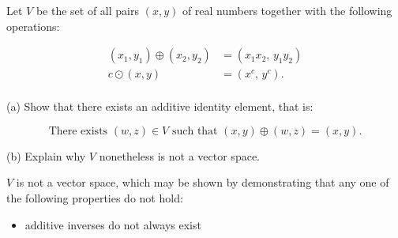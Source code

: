 
\begin{exerciseStatement}


 Let \(V\) be the set of all pairs \((x,y)\) of real numbers together with the following operations: 


\begin{align*} (x_1,y_1)\oplus (x_2,y_2)&= \left(x_{1} x_{2},\,y_{1} y_{2}\right)  \\c \odot (x,y) &= \left(x^{c},\,y^{c}\right) . \\ \end{align*}
            

 (a) Show that there exists an additive identity element, that is: 

\[\text{There exists }(w,z)\in V\text{ such that }(x,y)\oplus(w,z)=(x,y).
    \]

 (b) Explain why \(V\) nonetheless is not a vector space. 


\end{exerciseStatement}
    
\begin{exerciseAnswer} 


\(V\) is not a vector space, which may be shown by demonstrating that any one of the following properties do not hold: 


\begin{itemize}
\item additive inverses do not always exist
\end{itemize}
    
\end{exerciseAnswer}
    
